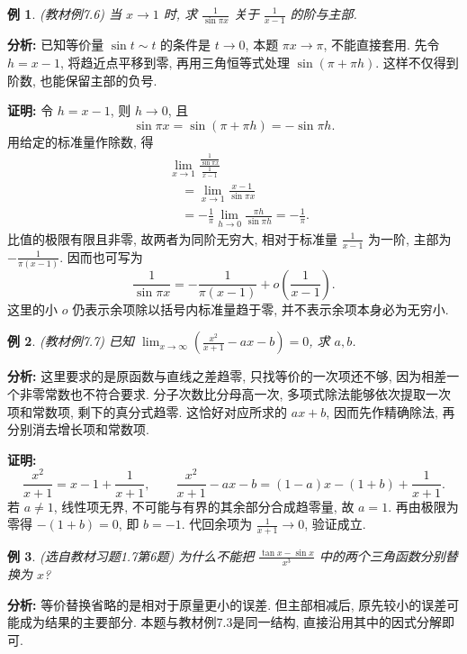 \documentclass[UTF8,openany]{ctexbook}
\theoremstyle{chinesetextbook}
\newtheorem{example}{例}[section]
\newenvironment{cnproof}{\par\indent\textbf{证明:} \ignorespaces}{\par}
\begin{document}
\begin{example}
(教材例7.6) 当 $x\to1$ 时, 求 $\displaystyle \frac1{\sin\pi x}$ 关于 $\displaystyle \frac1{x-1}$ 的阶与主部.
\end{example}
\par\indent\textbf{分析:} 已知等价量 $\sin t\sim t$ 的条件是 $t\to0$, 本题 $\pi x\to\pi$, 不能直接套用. 先令 $h=x-1$, 将趋近点平移到零, 再用三角恒等式处理 $\sin(\pi+\pi h)$. 这样不仅得到阶数, 也能保留主部的负号.
\begin{cnproof}
令 $h=x-1$, 则 $h\to0$, 且
\[
\sin\pi x=\sin(\pi+\pi h)=-\sin\pi h.
\]
用给定的标准量作除数, 得
\[
\begin{aligned}
&\lim_{x\to1}\frac{\frac1{\sin\pi x}}{\frac1{x-1}}\\
&\quad=\lim_{x\to1}\frac{x-1}{\sin\pi x}\\
&\quad=-\frac1\pi\lim_{h\to0}\frac{\pi h}{\sin\pi h}=-\frac1\pi.
\end{aligned}
\]
比值的极限有限且非零, 故两者为同阶无穷大, 相对于标准量 $\displaystyle\frac1{x-1}$ 为一阶, 主部为 $\displaystyle-\frac1{\pi(x-1)}$. 因而也可写为
\[
\frac1{\sin\pi x}=-\frac1{\pi(x-1)}+o\!\left(\frac1{x-1}\right).
\]
这里的小 $o$ 仍表示余项除以括号内标准量趋于零, 并不表示余项本身必为无穷小.
\end{cnproof}
\begin{example}
(教材例7.7) 已知 $\displaystyle \lim_{x\to\infty}(\frac{x^2}{x+1}-ax-b)=0$, 求 $a,b$.
\end{example}
\par\indent\textbf{分析:} 这里要求的是原函数与直线之差趋零, 只找等价的一次项还不够, 因为相差一个非零常数也不符合要求. 分子次数比分母高一次, 多项式除法能够依次提取一次项和常数项, 剩下的真分式趋零. 这恰好对应所求的 $ax+b$, 因而先作精确除法, 再分别消去增长项和常数项.
\begin{cnproof}
\[
\frac{x^2}{x+1}=x-1+\frac1{x+1},
\qquad
\frac{x^2}{x+1}-ax-b=(1-a)x-(1+b)+\frac1{x+1}.
\]
若 $a\ne1$, 线性项无界, 不可能与有界的其余部分合成趋零量, 故 $a=1$. 再由极限为零得 $-(1+b)=0$, 即 $b=-1$. 代回余项为 $\displaystyle \frac1{x+1}\to0$, 验证成立.
\end{cnproof}
\begin{example}
(选自教材习题1.7第6题) 为什么不能把 $\displaystyle \frac{\tan x-\sin x}{x^3}$ 中的两个三角函数分别替换为 $x$?
\end{example}
\par\indent\textbf{分析:} 等价替换省略的是相对于原量更小的误差. 但主部相减后, 原先较小的误差可能成为结果的主要部分. 本题与教材例7.3是同一结构, 直接沿用其中的因式分解即可.
\end{document}
